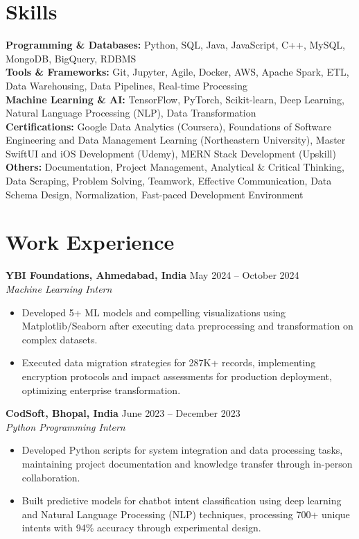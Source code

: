 \documentclass[a4paper,10pt]{article}
\begin{document}
\section*{Skills}
\textbf{Programming \& Databases: } Python, SQL, Java, JavaScript, C++, MySQL, MongoDB, BigQuery, RDBMS \\
\textbf{Tools \& Frameworks:}   Git, Jupyter, Agile, Docker, AWS, Apache Spark, ETL, Data Warehousing, Data Pipelines, Real-time Processing\\
\textbf{Machine Learning \& AI: } TensorFlow, PyTorch, Scikit-learn, Deep Learning, Natural Language Processing (NLP), Data Transformation \\
\textbf{Certifications:} Google Data Analytics (Coursera), Foundations of Software Engineering and Data Management Learning (Northeastern University), Master SwiftUI and iOS Development (Udemy), MERN Stack Development (Upskill) \\
\textbf{Others: }Documentation, Project Management, Analytical \& Critical Thinking, Data Scraping, Problem Solving, Teamwork, Effective Communication, Data Schema Design, Normalization, Fast-paced Development Environment \\

\vspace{-4mm}

\section*{Work Experience}
\textbf{YBI Foundations, Ahmedabad, India} \hfill May 2024 -- October 2024\\
\textit{Machine Learning Intern} \\
\begin{itemize}[leftmargin=*, itemsep=0pt, parsep=1pt]
\vspace{-6mm}
\item Developed 5+ ML models and compelling visualizations using Matplotlib/Seaborn after executing data preprocessing and transformation on complex datasets.
\item Executed data migration strategies for 287K+ records, implementing encryption protocols and impact assessments for production deployment, optimizing enterprise transformation.
\end{itemize}
\textbf{CodSoft, Bhopal, India} \hfill June 2023 -- December 2023\\
\textit{Python Programming Intern} \\
\begin{itemize}[leftmargin=*, itemsep=0pt, parsep=1pt]
\vspace{-6mm}
\item Developed Python scripts for system integration and data processing tasks, maintaining project documentation and knowledge transfer through in-person collaboration.
\item Built predictive models for chatbot intent classification using deep learning and Natural Language Processing (NLP) techniques, processing 700+ unique intents with 94\% accuracy through experimental design.
\vspace{-1mm}
\end{itemize}
\end{document}
